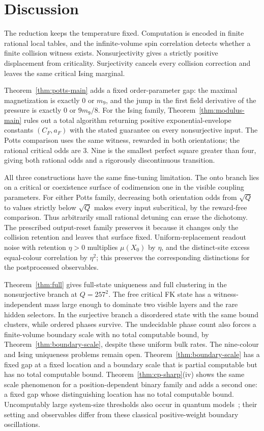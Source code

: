 \section{Discussion}\label{sec:discussion}
The reduction keeps the temperature fixed. Computation is encoded in finite rational local tables, and the infinite-volume spin correlation detects whether a finite collision witness exists. Nonsurjectivity gives a strictly positive displacement from criticality. Surjectivity cancels every collision correction and leaves the same critical Ising marginal.

Theorem~\ref{thm:potts-main} adds a fixed order-parameter gap: the maximal magnetization is exactly $0$ or $m_9$, and the jump in the first field derivative of the pressure is exactly $0$ or $9m_9/8$. For the Ising family, Theorem~\ref{thm:modulus-main} rules out a total algorithm returning positive exponential-envelope constants $(C_F,a_F)$ with the stated guarantee on every nonsurjective input. The Potts comparison uses the same witness, rewarded in both orientations; the rational critical odds are $3$. Nine is the smallest perfect square greater than four, giving both rational odds and a rigorously discontinuous transition.

All three constructions have the same fine-tuning limitation. The onto branch lies on a critical or coexistence surface of codimension one in the visible coupling parameters. For either Potts family, decreasing both orientation odds from $\sqrt Q$ to values strictly below $\sqrt Q$ makes every input subcritical, by the reward-free comparison. Thus arbitrarily small rational detuning can erase the dichotomy. The prescribed output-reset family preserves it because it changes only the collision retention and leaves that surface fixed. Uniform-replacement readout noise with retention $\eta>0$ multiplies $\mu(X_0)$ by $\eta$, and the distinct-site excess equal-colour correlation by $\eta^2$; this preserves the corresponding distinctions for the postprocessed observables.

Theorem~\ref{thm:full} gives full-state uniqueness and full clustering in the nonsurjective branch at $Q=257^2$. The free critical FK state has a witness-independent mass large enough to dominate two visible layers and the rare hidden selectors. In the surjective branch a disordered state with the same bound clusters, while ordered phases survive. The undecidable phase count also forces a finite-volume boundary scale with no total computable bound, by Theorem~\ref{thm:boundary-scale}, despite these uniform bulk rates. The nine-colour and Ising uniqueness problems remain open. Theorem~\ref{thm:boundary-scale} has a fixed gap at a fixed location and a boundary scale that is partial computable but has no total computable bound. Theorem~\ref{thm:cp-sharp}(iv) shows the same scale phenomenon for a position-dependent binary family and adds a second one: a fixed gap whose distinguishing location has no total computable bound. Uncomputably large system-size thresholds also occur in quantum models~\cite{BCLPW2018,BCLPG2020,CPGW}; their setting and observables differ from these classical positive-weight boundary oscillations.

